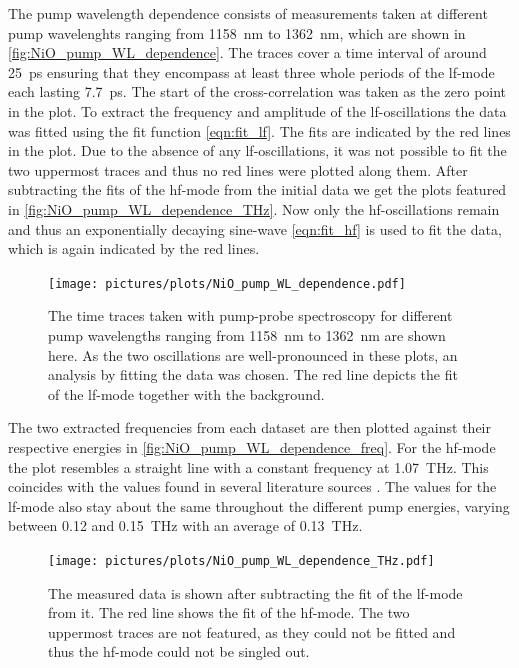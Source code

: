 The pump wavelength dependence consists of measurements taken at different pump wavelenghts ranging from \qty{1158}{nm} to \qty{1362}{nm}, which are shown in \autoref{fig:NiO_pump_WL_dependence}.
The traces cover a time interval of around \qty{25}{ps} ensuring that they encompass at least three whole periods of the lf-mode each lasting \qty{7.7}{ps}.
The start of the cross-correlation was taken as the zero point in the plot.
To extract the frequency and amplitude of the lf-oscillations the data was fitted using the fit function \autoref{eqn:fit_lf}.
The fits are indicated by the red lines in the plot. 
Due to the absence of any lf-oscillations, it was not possible to fit the two uppermost traces and thus no red lines were plotted along them.
After subtracting the fits of the hf-mode from the initial data we get the plots featured in \autoref{fig:NiO_pump_WL_dependence_THz}.
Now only the hf-oscillations remain and thus an exponentially decaying sine-wave \autoref{eqn:fit_hf} is used to fit the data, which is again indicated by the red lines.
\begin{figure}[ht]
    \centering
    \texttt{[image: pictures/plots/NiO\_pump\_WL\_dependence.pdf]}
    \caption{The time traces taken with pump-probe spectroscopy for different pump wavelengths ranging from \qty{1158}{nm} to \qty{1362}{nm} are shown here. As the two oscillations are well-pronounced in these plots, an analysis by fitting the data was chosen. The red line depicts the fit of the lf-mode together with the background.}
    \label{fig:NiO_pump_WL_dependence}
\end{figure}
\FloatBarrier
The two extracted frequencies from each dataset are then plotted against their respective energies in \autoref{fig:NiO_pump_WL_dependence_freq}.
For the hf-mode the plot resembles a straight line with a constant frequency at \qty{1.07}{THz}.
This coincides with the values found in several literature sources \cite{lockwood_one-_1992}\cite{hisamoto_kondoh_antiferromagnetic_1960}.
The values for the lf-mode also stay about the same throughout the different pump energies, varying between 0.12 and \qty{0.15}{THz} with an average of \qty{0.13}{THz}.
\begin{figure}[ht]
    \centering
    \texttt{[image: pictures/plots/NiO\_pump\_WL\_dependence\_THz.pdf]}
    \caption{The measured data is shown after subtracting the fit of the lf-mode from it. The red line shows the fit of the hf-mode. The two uppermost traces are not featured, as they could not be fitted and thus the hf-mode could not be singled out.}
    \label{fig:NiO_pump_WL_dependence_THz}
\end{figure}
